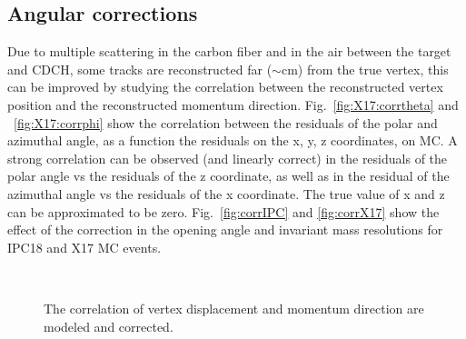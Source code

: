 \begin{refsection}
        \subsection{Angular corrections}
        Due to multiple scattering in the carbon fiber and in the air between the target and CDCH, some tracks are reconstructed far ($\sim$cm) from the true vertex, this can be improved by studying the correlation between the reconstructed vertex position and the reconstructed momentum direction. 
        Fig.~\ref{fig:X17:corrtheta} and ~\ref{fig:X17:corrphi} show the correlation between the residuals of the polar and azimuthal angle, as a function the residuals on the x, y, z coordinates, on MC. 
        A strong correlation can be observed (and linearly correct) in the residuals of the polar angle vs the residuals of the z coordinate, as well as in the residual of the azimuthal angle vs the residuals of the x coordinate.  
        The true value of x and z can be approximated to be zero.
        Fig.~\ref{fig:corrIPC} and \ref{fig:corrX17} show the effect of the correction in the opening angle and invariant mass resolutions for IPC18 and X17 MC events.
        
        \begin{figure}
            \centering
            \\\vspace{1cm}
            \caption[X17: Angular correlations]{The correlation of vertex displacement and momentum direction are modeled and corrected.}
        \end{figure}
        



\end{refsection}
